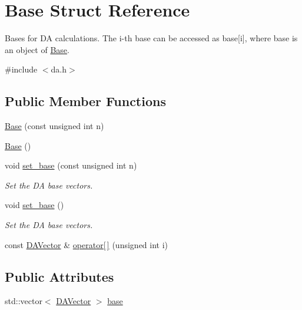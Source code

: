 \hypertarget{struct_base}{}\section{Base Struct Reference}
\label{struct_base}


Bases for DA calculations. The i-\/th base can be accessed as base\mbox{[}i\mbox{]}, where base is an object of \mbox{\hyperlink{struct_base}{Base}}.  




{\ttfamily \#include $<$da.\+h$>$}

\subsection*{Public Member Functions}
\begin{DoxyCompactItemize}
\item 
\mbox{\hyperlink{struct_base_afb04e0c2fd50911ddc8f7899ce3a1f4c}{Base}} (const unsigned int n)
\item 
\mbox{\hyperlink{struct_base_a5ffe0568374d8b9b4c4ec32953fd6453}{Base}} ()
\item 
void \mbox{\hyperlink{struct_base_adea12523c3817b8ee387618307f1d273}{set\+\_\+base}} (const unsigned int n)
\begin{DoxyCompactList}\small\item\em Set the DA base vectors. \end{DoxyCompactList}\item 
void \mbox{\hyperlink{struct_base_abb310515e957c2c606b068dec5a48ad4}{set\+\_\+base}} ()
\begin{DoxyCompactList}\small\item\em Set the DA base vectors. \end{DoxyCompactList}\item 
const \mbox{\hyperlink{struct_d_a_vector}{D\+A\+Vector}} \& \mbox{\hyperlink{struct_base_a6955a620bff8ba48f55244eaed48735d}{operator\mbox{[}$\,$\mbox{]}}} (unsigned int i)
\end{DoxyCompactItemize}
\subsection*{Public Attributes}
\begin{DoxyCompactItemize}
\item 
std\+::vector$<$ \mbox{\hyperlink{struct_d_a_vector}{D\+A\+Vector}} $>$ \mbox{\hyperlink{struct_base_adb3cdc5b0035be7540ea8e0b0450c637}{base}}
\end{DoxyCompactItemize}


